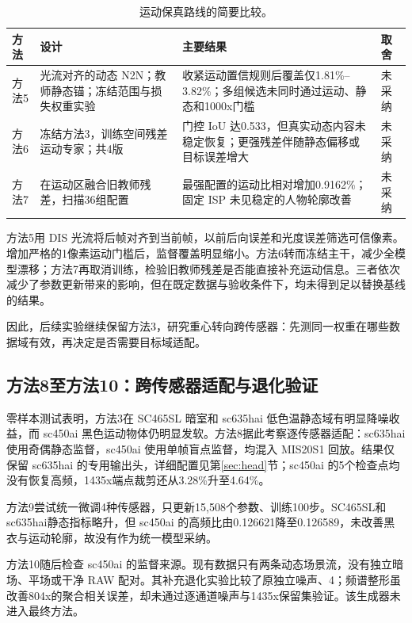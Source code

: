 \documentclass[11pt,a4paper,UTF8,fontset=fandol]{ctexart}
\newcommand{\dn}{\ensuremath{\,\mathrm{DN}}}
\begin{document}
\begin{table}[H]
\centering\small
\caption{运动保真路线的简要比较。}
\label{tab:motion_trials}
\begin{tabular}{p{}p{}p{}p{}}
\toprule
方法 & 设计 & 主要结果 & 取舍 \\
\midrule
方法5 & 光流对齐的动态 N2N；教师静态锚；冻结范围与损失权重实验 & 收紧运动置信规则后覆盖仅1.81\%--3.82\%；多组候选未同时通过运动、静态和1000x门槛 & 未采纳 \\
方法6 & 冻结方法3，训练空间残差运动专家；共4版 & 门控 IoU 达0.533，但真实动态内容未稳定恢复；更强残差伴随静态偏移或目标误差增大 & 未采纳 \\
方法7 & 在运动区融合旧教师残差，扫描36组配置 & 最强配置的运动比相对增加0.9162\%；固定 ISP 未见稳定的人物轮廓改善 & 未采纳 \\
\bottomrule
\end{tabular}
\end{table}

方法5用 DIS 光流将后帧对齐到当前帧，以前后向误差和光度误差筛选可信像素。增加严格的1像素运动门槛后，监督覆盖明显缩小。方法6转而冻结主干，减少全模型漂移；方法7再取消训练，检验旧教师残差是否能直接补充运动信息。三者依次减少了参数更新带来的影响，但在既定数据与验收条件下，均未得到足以替换基线的结果。

因此，后续实验继续保留方法3，研究重心转向跨传感器：先测同一权重在哪些数据域有效，再决定是否需要目标域适配。

\subsection{方法8至方法10：跨传感器适配与退化验证}

零样本测试表明，方法3在 SC465SL 暗室和 sc635hai 低色温静态域有明显降噪收益，而 sc450ai 黑色运动物体仍明显发软。方法8据此考察逐传感器适配：sc635hai 使用奇偶静态监督，sc450ai 使用单帧盲点监督，均混入 MIS20S1 回放。结果仅保留 sc635hai 的专用输出头，详细配置见第\ref{sec:head}节；sc450ai 的5个检查点均没有恢复高频，1435x端点裁剪还从3.28\%升至4.64\%。

方法9尝试统一微调4种传感器，只更新15,508个参数、训练100步。SC465SL和sc635hai静态指标略升，但 sc450ai 的高频比由0.126621降至0.126589，未改善黑衣与运动轮廓，故没有作为统一模型采纳。

方法10随后检查 sc450ai 的监督来源。现有数据只有两条动态场景流，没有独立暗场、平场或干净 RAW 配对。其补充退化实验比较了原独立噪声、4；频谱整形虽改善804x的聚合相关误差，却未通过逐通道噪声与1435x保留集验证。该生成器未进入最终方法。
\end{document}
